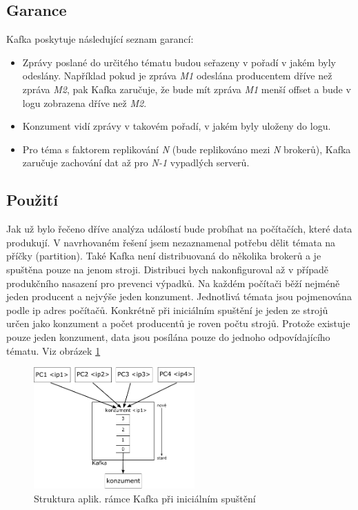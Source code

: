 \documentclass[
  digital, %
  table,   %
  nolof,     %
  nolot,     %
  oneside, %
  nocover,
  monochrome,
  12pt
]{fithesis3}
\begin{document}
\subsection*{Garance}
Kafka poskytuje následující seznam garancí:
\begin{itemize}
  \item Zprávy poslané do určitého tématu budou seřazeny v pořadí v jakém byly odeslány. Například pokud je zpráva \textit{M1} odeslána producentem dříve než zpráva \textit{M2}, pak Kafka zaručuje, že bude mít zpráva \textit{M1} menší offset a bude v logu zobrazena dříve než \textit{M2}.
  \item Konzument vidí zprávy v takovém pořadí, v jakém byly uloženy do logu.
  \item Pro téma s faktorem replikování \textit{N} (bude replikováno mezi \textit{N} brokerů), Kafka zaručuje zachování dat až pro \textit{N-1} vypadlých serverů.
\end{itemize}

\subsection*{Použití}
Jak už bylo řečeno dříve analýza událostí bude probíhat na počítačích, které data produkují. V navrhovaném řešení jsem nezaznamenal potřebu dělit témata na příčky (partition). Také Kafka není distribuovaná do několika brokerů a je spuštěna pouze na jenom stroji. Distribuci bych nakonfiguroval až v případě produkčního nasazení pro prevenci výpadků. Na každém počítači běží nejméně jeden producent a nejvýše jeden konzument. Jednotlivá témata jsou pojmenována podle ip adres počítačů. Konkrétně při iniciálním spuštění je jeden ze strojů určen jako konzument a počet producentů je roven počtu strojů. Protože existuje pouze jeden konzument, data jsou posílána pouze do jednoho odpovídajícího tématu. Viz obrázek \ref{fig:kafka-impl}

\begin{figure}[H]
	\centering
    \includegraphics[width=0.55\textwidth, height=0.3\textheight]{images/kafka-impl.png}
    \caption{Struktura aplik. rámce Kafka při iniciálním spuštění}
    \label{fig:kafka-impl}
\end{figure}
\end{document}
